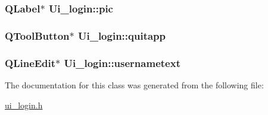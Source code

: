 \hypertarget{classUi__login_a6767a39e4c6308ca8a8d753a7a71b9e3}{
\subsubsection[{pic}]{\setlength{\rightskip}{0pt plus 5cm}Q\-Label$\ast$ Ui\-\_\-login\-::pic}}\label{classUi__login_a6767a39e4c6308ca8a8d753a7a71b9e3}
\hypertarget{classUi__login_a5c658c9c82384b36f181f89e39fb01f5}{
\subsubsection[{quitapp}]{\setlength{\rightskip}{0pt plus 5cm}Q\-Tool\-Button$\ast$ Ui\-\_\-login\-::quitapp}}\label{classUi__login_a5c658c9c82384b36f181f89e39fb01f5}
\hypertarget{classUi__login_a8a6b452a7614a498cf5de6121e6df31b}{
\subsubsection[{usernametext}]{\setlength{\rightskip}{0pt plus 5cm}Q\-Line\-Edit$\ast$ Ui\-\_\-login\-::usernametext}}\label{classUi__login_a8a6b452a7614a498cf5de6121e6df31b}


The documentation for this class was generated from the following file\-:\begin{DoxyCompactItemize}
\item 
\hyperlink{ui__login_8h}{ui\-\_\-login.\-h}\end{DoxyCompactItemize}
